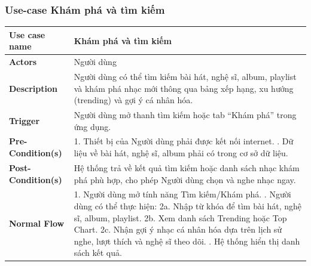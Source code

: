 \documentclass[a4paper]{article}
\newcommand{\cach}{\hspace*{1.5em}\ignorespaces}
\begin{document}
\subsubsection{Use-case Khám phá và tìm kiếm}
\begin{table}[H]
	\centering
	\renewcommand{\arraystretch}{1.3} %
	\begin{tabularx}{\textwidth}{|l|X|}
		\hline
		\textbf{Use case name} & Khám phá và tìm kiếm                                                                                                                                 \\ \hline
		\textbf{Actors}        & Người dùng                                                                                                                                           \\ \hline
		\textbf{Description}   & Người dùng có thể tìm kiếm bài hát, nghệ sĩ, album, playlist và khám phá nhạc mới thông qua bảng xếp hạng, xu hướng (trending) và gợi ý cá nhân hóa. \\ \hline
		\textbf{Trigger}       & Người dùng mở thanh tìm kiếm hoặc tab “Khám phá” trong ứng dụng.                                                                                     \\ \hline
		\textbf{Pre-Condition(s)}
		                       & 1. Thiết bị của Người dùng phải được kết nối internet. \newline
		2. Dữ liệu về bài hát, nghệ sĩ, album phải có trong cơ sở dữ liệu.                                                                                                            \\ \hline
		\textbf{Post-Condition(s)}
		                       & Hệ thống trả về kết quả tìm kiếm hoặc danh sách nhạc khám phá phù hợp, cho phép Người dùng chọn và nghe nhạc ngay.                                   \\ \hline
		\textbf{Normal Flow}
		                       & 1. Người dùng mở tính năng Tìm kiếm/Khám phá. \newline
		2. Người dùng có thể thực hiện: \newline
		\cach 2a. Nhập từ khóa để tìm bài hát, nghệ sĩ, album, playlist. \newline
		\cach 2b. Xem danh sách Trending hoặc Top Chart. \newline
		\cach 2c. Nhận gợi ý nhạc cá nhân hóa dựa trên lịch sử nghe, lượt thích và nghệ sĩ theo dõi. \newline
		3. Hệ thống hiển thị danh sách kết quả. \newline

\end{tabularx}
\end{table}
\end{document}

